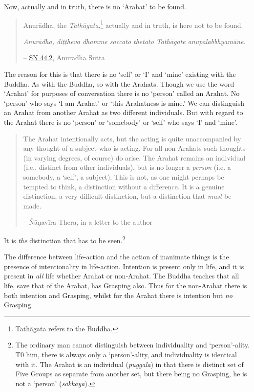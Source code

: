 Now, actually and in truth, there is no `Arahat' to be found.

\begin{quote}
Anurādha, the \textit{Tathāgata},\footnote{Tathāgata refers to the Buddha.} actually and in truth, is here not to be found.

\textit{Anurādha, diṭṭheva dhamme saccato thetato Tathāgate anupalabbhyamāne.}

 -- \href{https://suttacentral.net/sn44.2/en/sujato}{SN 44.2}, Anurādha Sutta
\end{quote}

The reason for this is that there is no `self' or `I' and `mine' existing with the Buddha. As with the Buddha, so with the Arahats. Though we use the word `Arahat' for purposes of conversation there is no `person' called an Arahat. No `person' who says `I am Arahat' or `this Arahatness is mine.' We can distinguish an Arahat from another Arahat as two different individuals. But with regard to the Arahat there is no `person' or `somebody' or `self' who says `I' and `mine'.

\begin{quote}
The Arahat intentionally acts, but the acting is quite unaccompanied by any thought of a subject who is acting. For all non-Arahats such thoughts (in varying degrees, of course) do arise. The Arahat remains an individual (i.e., distinct from other individuals), but is no longer a \emph{person} (i.e. a somebody, a `self', a subject). This is not, as one might perhaps be tempted to think, a distinction without a difference. It is a genuine distinction, a very difficult distinction, but a distinction that \emph{must} be made.

 -- Ñāṇavīra Thera, in a letter to the author
\end{quote}

It is \emph{the} distinction that has to be seen.\footnote{The ordinary man cannot distinguish between individuality and `person'-ality. T0 him, there is always only a `person'-ality, and individuality is identical with it. The Arahat is an individual (\textit{puggala}) in that there is distinct set of Five Groups as separate from another set, but there being no Grasping, he is not a `person' (\textit{sakkāya}).}

The difference between life-action and the action of inanimate things is the presence of intentionality in life-action. Intention is present only in life, and it is present in \emph{all} life whether Arahat or non-Arahat. The Buddha teaches that all life, save that of the Arahat, has Grasping also. Thus for the non-Arahat there is both intention and Grasping, whilst for the Arahat there is intention but \emph{no} Grasping.

